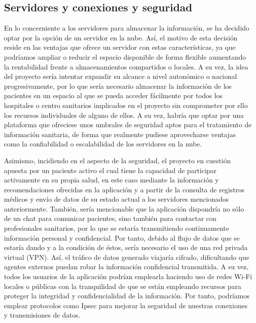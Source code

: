 \documentclass{article}
\begin{document}
\subsection{Servidores y conexiones y seguridad}


En lo concerniente a los servidores para almacenar la información,  se
ha decidido optar por la opción de un servidor en la  nube.   Así,  el
motivo de esta decisión reside en las ventajas que ofrece un  servidor
con estas características, ya  que  podríamos  ampliar	o  reducir  el
espacio disponible de forma flexible aumentando la rentabilidad frente
a almacenamientos compartidos o  locales.   A  su  vez,  la  idea  del
proyecto sería intentar expandir  su  alcance  a  nivel  autonómico  o
nacional progresivamente, por lo  que  sería  necesario  almacenar  la
información de los pacientes en un espacio al  que  se	pueda  acceder
fácilmente por todos los hospitales o centro sanitarios implicados  en
el proyecto sin comprometer por  ello  los  recursos  individuales  de
alguno de ellos.  A su vez, habría que optar por  una  plataforma  que
ofreciese unos umbrales de seguridad  aptos  para  el  tratamiento  de
información sanitaria, de forma  que  realmente  pudiese  aprovecharse
ventajas como la confiabilidad o escalabilidad de los servidores en la
nube.

Asimismo, incidiendo en el aspecto de la  seguridad,  el  proyecto  en
cuestión apuesta por un paciente activo el cual tiene la capacidad  de
participar activamente en su propia salud, en este  caso  mediante  la
información y recomendaciones ofrecidas en la aplicación y a partir de
la consulta de registros médicos y envío de datos de su estado	actual
a los servidores mencionados anteriormente. También, sería mencionable
que la aplicación  dispondría  no  sólo  de  un  chat  para  comunicar
pacientes, sino también para contactar con  profesionales  sanitarios,
por lo que se estaría transmitiendo continuamente información personal
y confidencial.  Por tanto, debido al flujo de datos  que  se  estaría
dando y a la condición de éstos, sería necesario el  uso  de  una  red
privada virtual (VPN).	Así, el tráfico  de  datos  generado  viajaría
cifrado, dificultando que agentes externos puedan robar la información
confidencial  transmitida.   A	su  vez,  todos  los  usuarios	de  la
aplicación podrían emplearla haciendo uso de  redes  Wi-Fi  locales  o
públicas con la tranquilidad de que se están empleando	recursos  para
proteger la integridad y  confidencialidad  de	la  información.   Por
tanto,	podríamos  emplear  protocolos	como  Ipsec  para  mejorar  la
seguridad  de  nuestras   conexiones   y   transmisiones   de	datos.
\end{document}
